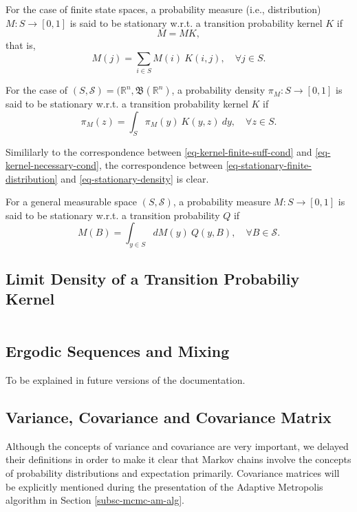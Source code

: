 For the case of finite state spaces,
a probability measure (i.e., distribution) $M:S\rightarrow [0,1]$ is said to be stationary w.r.t. a transition probability kernel $K$ if
\begin{equation*}
M = MK,
\end{equation*}
that is,
\begin{equation}\label{eq-stationary-finite-distribution}
M(j) = \sum_{i\in S}M(i)~K(i,j),\quad\forall j\in S.
\end{equation}

For the case of $(S,\mathcal{S})=(\mathbb{R}^n,\mathfrak{B}(\mathbb{R}^n)$,
a probability density $\pi_M:S\rightarrow [0,1]$ is said to be stationary w.r.t. a transition probability kernel $K$ if
\begin{equation}\label{eq-stationary-density}
\pi_M(z) = \int_{S}\pi_M(y)~K(y,z)~dy,\quad\forall z\in S.
\end{equation}

Simililarly to the correspondence between \eqref{eq-kernel-finite-suff-cond} and \eqref{eq-kernel-necessary-cond},
the correspondence between \eqref{eq-stationary-finite-distribution} and \eqref{eq-stationary-density} is clear.

For a general measurable space $(S,\mathcal{S})$,
a probability measure $M:S\rightarrow [0,1]$ is said to be stationary w.r.t. a transition probability $Q$ if
\begin{equation*}
M(B) = \int_{y\in S}dM(y)~Q(y,B),\quad\forall B\in\mathcal{S}.
\end{equation*}

\subsection{Limit Density of a Transition Probabiliy Kernel}
$~$\\

\subsection{Ergodic Sequences and Mixing}

To be explained in future versions of the documentation.

\subsection{Variance, Covariance and Covariance Matrix}

Although the concepts of variance and covariance are very important, we delayed their definitions in order to make it clear that Markov chains involve the concepts of probability distributions and expectation primarily.
Covariance matrices will be explicitly mentioned during the presentation of the Adaptive Metropolis algorithm in Section \ref{subsc-mcmc-am-alg}.

